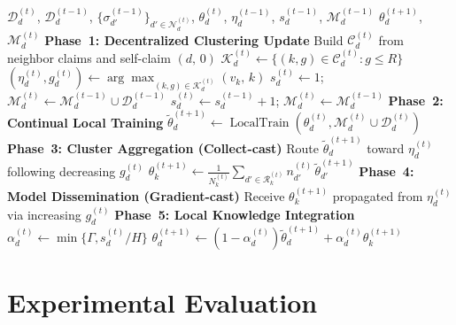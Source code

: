 \documentclass[conference]{IEEEtran}
\theoremstyle{plain}
\theoremstyle{definition}
\begin{document}
\begin{algorithm}[t]
\caption{\approach{}: 
One communication round for device~$d$. 
Here, $\mathcal{D}_d^{(t)}$ is the current local dataset, 
$\eta_d^{(t)}$ is the current cluster leader, 
$g_d^{(t)}$ the distance-to-leader field, 
$s_d^{(t)}$ the permanence counter in the current region, 
$\mathcal{M}_d^{(t)}$ the historical replay memory, 
$\widetilde{\theta}_d^{(t+1)}$ the locally trained model, 
$\theta_k^{(t+1)}$ the regional consensus, 
$\Gamma$ the maximum collective mixing factor,
and $H$ the adaptive-averaging horizon.}
\label{alg:c2fl}
\begin{algorithmic}[1]
\REQUIRE $\mathcal{D}_d^{(t)}$, $\mathcal{D}_d^{(t-1)}$, $\{\sigma_{d'}^{(t-1)}\}_{d' \in \mathcal{N}_d^{(t)}}$, $\theta_d^{(t)}$, $\eta_d^{(t-1)}$, $s_d^{(t-1)}$, $\mathcal{M}_d^{(t-1)}$
\ENSURE $\theta_d^{(t+1)}$, $\mathcal{M}_d^{(t)}$
\STATE \textbf{Phase~1: Decentralized Clustering Update}
\STATE Build $\mathcal{C}_d^{(t)}$ from neighbor claims and self-claim $(d,\,0)$
\STATE $\mathcal{K}_d^{(t)} \leftarrow \{(k,g)\in\mathcal{C}_d^{(t)}: g \le R\}$
\STATE $(\eta_d^{(t)}, g_d^{(t)}) \leftarrow \arg\max_{(k,g)\in\mathcal{K}_d^{(t)}} (v_k,\, k)$
\STATE $s_d^{(t)} \leftarrow 1$; $\mathcal{M}_d^{(t)} \leftarrow \mathcal{M}_d^{(t-1)} \cup \mathcal{D}_d^{(t-1)}$
\ELSE
\STATE $s_d^{(t)} \leftarrow s_d^{(t-1)} + 1$; $\mathcal{M}_d^{(t)} \leftarrow \mathcal{M}_d^{(t-1)}$
\ENDIF
\STATE \textbf{Phase~2: Continual Local Training}
\STATE $\widetilde{\theta}_d^{(t+1)} \leftarrow \operatorname{LocalTrain}(\theta_d^{(t)}, \mathcal{M}_d^{(t)} \cup \mathcal{D}_d^{(t)})$
\STATE \textbf{Phase~3: Cluster Aggregation (Collect-cast)}
\STATE Route $\widetilde{\theta}_d^{(t+1)}$ toward $\eta_d^{(t)}$ following decreasing $g_d^{(t)}$
\STATE $\theta_k^{(t+1)} \leftarrow
    \tfrac{1}{N_k^{(t)}}\textstyle\sum_{d'\in\mathcal{R}_k^{(t)}} n_{d'}^{(t)}\,\widetilde{\theta}_{d'}^{(t+1)}$
\ENDIF
\STATE \textbf{Phase~4: Model Dissemination (Gradient-cast)}
\STATE Receive $\theta_k^{(t+1)}$ propagated from $\eta_d^{(t)}$ via increasing $g_d^{(t)}$
\STATE \textbf{Phase~5: Local Knowledge Integration}
\STATE $\alpha_d^{(t)} \leftarrow \min\{\Gamma, s_d^{(t)}/H\}$
\STATE $\theta_d^{(t+1)} \leftarrow (1-\alpha_d^{(t)})\widetilde{\theta}_d^{(t+1)} + \alpha_d^{(t)}\theta_k^{(t+1)}$
\end{algorithmic}
\end{algorithm}


\section{Experimental Evaluation}\label{sec:eval}
\end{document}
